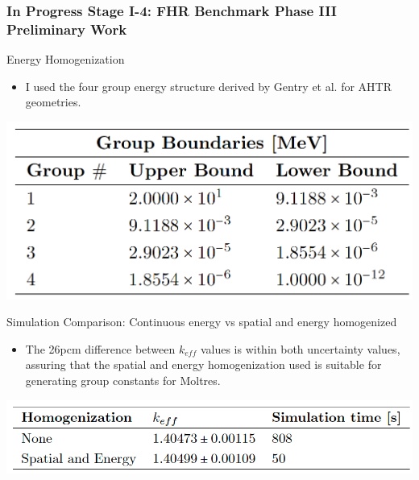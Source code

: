 \begin{frame}
    \frametitle{In Progress Stage I-4: FHR Benchmark Phase III Preliminary Work}
    \begin{block}{Energy Homogenization}
        \begin{itemize}
            \item I used the four group energy structure derived by Gentry et al. 
            \cite{gentry_development_2016} for AHTR geometries. 
        \end{itemize}
        \vspace{-0.4cm}
        \begin{table}[]
            \centering
            \begin{minipage}[c]{0.5\textwidth}
                \centering
                \includegraphics[width=0.6\linewidth]{figures/ahtr-energy-discr.png}
            \end{minipage}\hfill
            \begin{minipage}[c]{0.5\textwidth}
            \caption{4-group energy structures for AHTR geometry 
            derived by \cite{gentry_development_2016}.}
        \end{minipage}
        \end{table}
    \end{block}
    \vspace{-0.3cm}
    \begin{block}{Simulation Comparison: Continuous energy vs spatial 
        and energy homogenized}
        \begin{itemize}
            \item The 26pcm difference between $k_{eff}$ values is within both uncertainty values, 
            assuring that the spatial and energy homogenization used is suitable for generating 
            group constants for Moltres. 
        \end{itemize}
        \vspace{-0.3cm}
        \begin{table}[]
            \centering
            \begin{minipage}[c]{0.6\textwidth}
                \centering
                \includegraphics[width=0.8\linewidth]{figures/ahtr-homogenization.png}

\end{minipage}
\end{table}
\end{block}
\end{frame}

